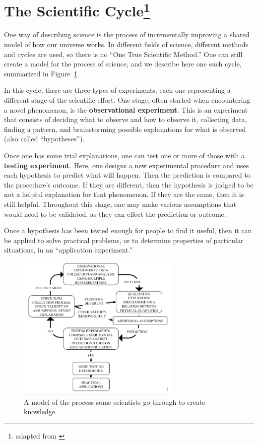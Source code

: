 \section{The Scientific Cycle\protect\footnote{adapted from \cite{etkina_college_2014}}}

One way of describing science is the process of incrementally improving a shared model of how our universe works. In different fields of science, different methods and cycles are used, so there is no ``One True Scientific Method.'' One can still create a model for the process of science, and we describe here one such cycle, summarized in Figure~\ref{me:fig:isle}.

In this cycle, there are three types of experiments, each one representing a different stage of the scientific effort. One stage, often started when encountering a novel phenomenon, is the \textbf{observational experiment}. This is an experiment that consists of deciding what to observe and how to observe it, collecting data, finding a pattern, and brainstorming possible explanations for what is observed (also called ``hypotheses'').

Once one has some trial explanations, one can test one or more of those with a \textbf{testing experiment}. Here, one designs a new experimental procedure and uses each hypothesis to predict what will happen. Then the prediction is compared to the procedure's outcome. If they are different, then the hypothesis is judged to be not a helpful explanation for that phenomenon. If they are the same, then it is still helpful. Throughout this stage, one may make various assumptions that would need to be validated, as they can effect the prediction or outcome.

Once a hypothesis has been tested enough for people to find it useful, then it can be applied to solve practical problems, or to determine properties of particular situations, in an ``application experiment.''

\begin{figure}
	\centering
	\includegraphics[width=0.7\textwidth]{measurement/islegraphic.png}
	\caption{A model of the process some scientists go through to create knowledge.\cite{etkina_millikan_2015}}\label{me:fig:isle}
\end{figure}


